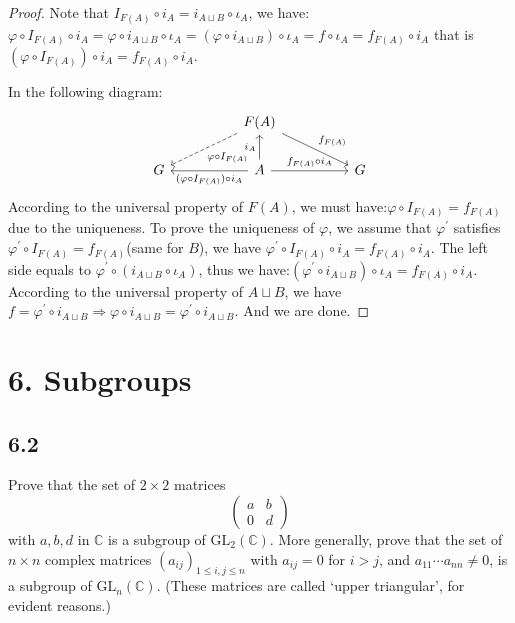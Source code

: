 \documentclass[a4paper, pdf, 12pt]{article}
\begin{document}
\begin{proof}
  Note that $I_{F(A)}\circ i_{A} = i_{A\sqcup B}\circ \iota_{A}$, we have:$\varphi \circ I_{F(A)}\circ i_{A} = \varphi \circ i_{A\sqcup B} \circ \iota_{A} = (\varphi\circ i_{A\sqcup B})\circ \iota_{A}
    = f\circ \iota_{A} = f_{F(A)} \circ i_{A}
  $ that is $(\varphi \circ I_{F(A)})\circ i_{A} = f_{F(A)}\circ i_{A}$.

  In the following diagram:
  $$
    \begin{tikzcd}[column sep=huge]
      & \ar[ld, dashed, "\varphi \circ I_{F(A)}"]F(A) \ar[rd, "f_{F(A)}"]& \\
      G  &  \ar[l, "(\varphi \circ I_{F(A)})\circ i_{A}"]A \ar[u, "i_{A}"] \ar[r, "f_{F(A)}\circ i_{A}"] & G
    \end{tikzcd}
  $$
  According to the universal property of $F(A)$, we must have:$\varphi \circ I_{F(A)} = f_{F(A)}$ due to the uniqueness.
  To prove the uniqueness of $\varphi$, we assume that $\varphi^{'}$ satisfies $\varphi^{'}\circ I_{F(A)} = f_{F(A)}$(same for $B$), we have
  $\varphi^{'}\circ I_{F(A)}\circ i_{A} = f_{F(A)}\circ i_{A}$. The left side equals to
  $\varphi^{'}\circ(i_{A\sqcup B}\circ \iota_{A})$, thus we have:$(\varphi^{'}\circ i_{A\sqcup B})\circ \iota_{A} = f_{F(A)}\circ i_{A}$. According to the universal property of $A\sqcup B$, we have $f = \varphi^{'}\circ i_{A\sqcup B} \Rightarrow \varphi \circ i_{A\sqcup B} = \varphi^{'}\circ i_{A\sqcup B}$.
  And we are done.

\end{proof}

\section*{6. Subgroups}
\subsection*{6.2}
Prove that the set of $2 \times 2$ matrices
$$
  \begin{pmatrix}
    a & b \\
    0 & d
  \end{pmatrix}
$$ with $a,b,d$ in $\mathbb{C}$ is a subgroup of $\mbox{GL}_{2}(\mathbb{C})$.
More generally, prove that the set of $n\times n$ complex matrices $(a_{ij})_{1\leq i,j\leq n}$ with $a_{ij} = 0$ for $i > j$, and $a_{11}\cdots a_{nn} \neq 0$,
is a subgroup of $\mbox{GL}_n(\mathbb{C})$. (These matrices are called `upper triangular', for evident
reasons.)
\end{document}
